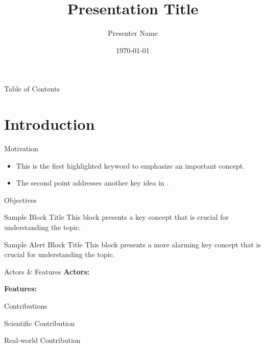 \documentclass{beamer}
\title{Presentation Title}
\author{Presenter Name}
\institute[short institute name]{Complete Institute Name}
\date{\today}
\begin{document}
\begin{frame}
	\titlepage
\end{frame}

\begin{frame}{Table of Contents}
	\tableofcontents
	\note{}
\end{frame}

\section{Introduction} 

\begin{frame}{Motivation}
	\begin{itemize} 	
		\item This is the first \alert{highlighted keyword} to emphasize an important concept.
		\item The second point addresses \alert{another key idea} in \cite{knuth:1984}.
	\end{itemize}
	\note{}
\end{frame}

\begin{frame}[label=objectives]{Objectives 
  \hyperlink{scope}{}
}
	\begin{block}{Sample Block Title}
		This block presents a \alert{key concept} that is crucial for understanding the topic.
	\end{block}
	\begin{alertblock}{Sample Alert Block Title}
		This block presents a more alarming \alert{key concept} that is crucial for understanding the topic.
	\end{alertblock}
	\note{}
\end{frame}

\begin{frame}{Actors \& Features}
	\textbf{Actors:}
									
	\textbf{Features:}
	\note{}
\end{frame}

\begin{frame}{Contributions}				
	\begin{block}{Scientific Contribution}
	\end{block}						
	\begin{block}{Real-world Contribution}
	\end{block}					
	\note{}
\end{frame}
\end{document}
